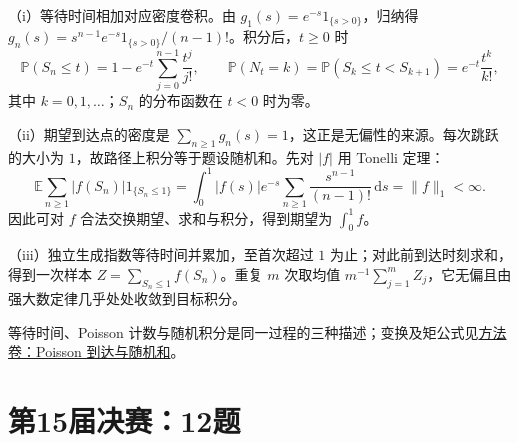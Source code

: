 \documentclass[UTF8,12pt,a4paper,fontset=fandol]{ctexbook}
\begin{document}
\begin{solve}

（i）等待时间相加对应密度卷积。由 $g_1(s)=e^{-s}1_{\{s>0\}}$，归纳得 $g_n(s)=s^{n-1}e^{-s}1_{\{s>0\}}/(n-1)!$。积分后，$t\ge0$ 时
\[
\mathbb P(S_n\le t)=1-e^{-t}\sum_{j=0}^{n-1}\frac{t^j}{j!},
\qquad
\mathbb P(N_t=k)=\mathbb P(S_k\le t<S_{k+1})=e^{-t}\frac{t^k}{k!},
\]
其中 $k=0,1,\dots$；$S_n$ 的分布函数在 $t<0$ 时为零。

（ii）期望到达点的密度是 $\sum_{n\ge1}g_n(s)=1$，这正是无偏性的来源。每次跳跃的大小为 $1$，故路径上积分等于题设随机和。先对 $|f|$ 用 Tonelli 定理：
\[
\mathbb E\sum_{n\ge1}|f(S_n)|1_{\{S_n\le1\}}
=\int_0^1|f(s)|e^{-s}\sum_{n\ge1}\frac{s^{n-1}}{(n-1)!}\,\mathrm ds
=\|f\|_1<\infty.
\]
因此可对 $f$ 合法交换期望、求和与积分，得到期望为 $\int_0^1f$。

（iii）独立生成指数等待时间并累加，至首次超过 $1$ 为止；对此前到达时刻求和，得到一次样本 $Z=\sum_{S_n\le1}f(S_n)$。重复 $m$ 次取均值 $m^{-1}\sum_{j=1}^mZ_j$，它无偏且由强大数定律几乎处处收敛到目标积分。

等待时间、Poisson 计数与随机积分是同一过程的三种描述；变换及矩公式见\hyperref[app:probability-poisson]{方法卷：Poisson 到达与随机和}。

\end{solve}

\section{第15届决赛：12题}\label{pr:fin15-high:12}
\end{document}
